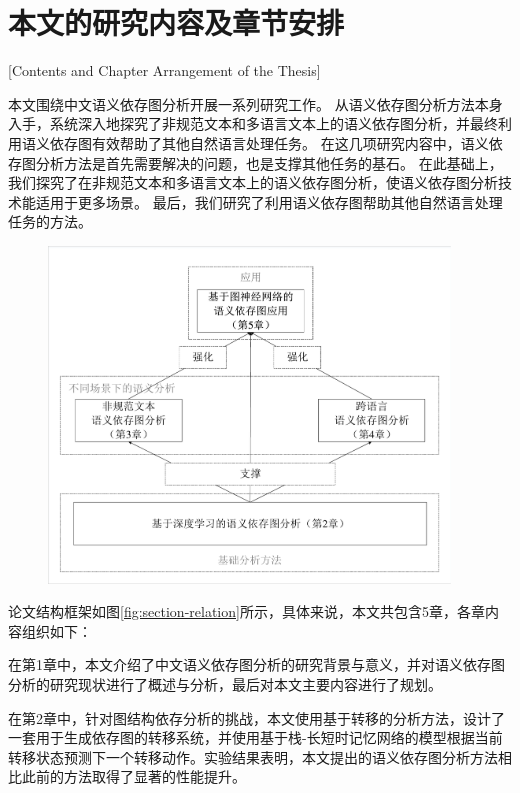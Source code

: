 

\section{本文的研究内容及章节安排}[Contents and Chapter Arrangement of the Thesis]

本文围绕中文语义依存图分析开展一系列研究工作。
从语义依存图分析方法本身入手，系统深入地探究了非规范文本和多语言文本上的语义依存图分析，并最终利用语义依存图有效帮助了其他自然语言处理任务。
在这几项研究内容中，语义依存图分析方法是首先需要解决的问题，也是支撑其他任务的基石。
在此基础上，我们探究了在非规范文本和多语言文本上的语义依存图分析，使语义依存图分析技术能适用于更多场景。
最后，我们研究了利用语义依存图帮助其他自然语言处理任务的方法。

\begin{figure}[htbp]
    \centering
    \includegraphics[width=0.95\textwidth]{figures/section-relation.pdf}
\end{figure}

论文结构框架如图\ref{fig:section-relation}所示，具体来说，本文共包含5章，各章内容组织如下：

在第1章中，本文介绍了中文语义依存图分析的研究背景与意义，并对语义依存图分析的研究现状进行了概述与分析，最后对本文主要内容进行了规划。

在第2章中，针对图结构依存分析的挑战，本文使用基于转移的分析方法，设计了一套用于生成依存图的转移系统，并使用基于栈-长短时记忆网络的模型根据当前转移状态预测下一个转移动作。实验结果表明，本文提出的语义依存图分析方法相比此前的方法取得了显著的性能提升。

